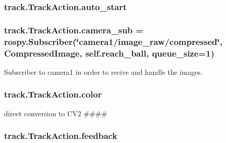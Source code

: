 \subsubsection[{\texorpdfstring{auto\+\_\+start}{auto_start}}]{\setlength{\rightskip}{0pt plus 5cm}track.\+Track\+Action.\+auto\+\_\+start\hspace{0.3cm}{\ttfamily [static]}}\hypertarget{classtrack_1_1TrackAction_aeb30f796983b2999ad62d71535795668}{}\label{classtrack_1_1TrackAction_aeb30f796983b2999ad62d71535795668}
\subsubsection[{\texorpdfstring{camera\+\_\+sub}{camera_sub}}]{\setlength{\rightskip}{0pt plus 5cm}track.\+Track\+Action.\+camera\+\_\+sub = rospy.\+Subscriber(\char`\"{}camera1/image\+\_\+raw/compressed\char`\"{}, Compressed\+Image, self.\+reach\+\_\+ball, {\bf queue\+\_\+size}=1)\hspace{0.3cm}{\ttfamily [static]}}\hypertarget{classtrack_1_1TrackAction_a71b1a13ec7fb0ba79d6f34416b7d54e1}{}\label{classtrack_1_1TrackAction_a71b1a13ec7fb0ba79d6f34416b7d54e1}


Subscriber to camera1 in order to recive and handle the images. 

\subsubsection[{\texorpdfstring{color}{color}}]{\setlength{\rightskip}{0pt plus 5cm}track.\+Track\+Action.\+color}\hypertarget{classtrack_1_1TrackAction_abba894c7d22403050003dc50f5d79bba}{}\label{classtrack_1_1TrackAction_abba894c7d22403050003dc50f5d79bba}


direct conversion to C\+V2 \#\#\#\# 

\subsubsection[{\texorpdfstring{feedback}{feedback}}]{\setlength{\rightskip}{0pt plus 5cm}track.\+Track\+Action.\+feedback\hspace{0.3cm}{\ttfamily [static]}}\hypertarget{classtrack_1_1TrackAction_acce0064c9d83a91f00d92a854014cdf5}{}\label{classtrack_1_1TrackAction_acce0064c9d83a91f00d92a854014cdf5}
